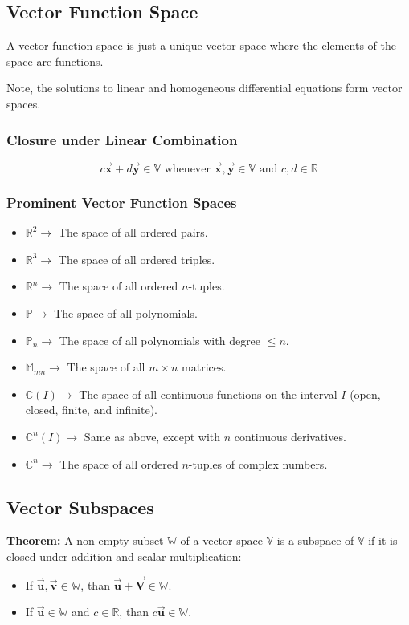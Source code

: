 \documentclass[12pt, landscape, twocolumn]{article}
\let\oldvec\vec
\renewcommand{\vec}[1]{\oldvec{\mathbf{ #1 } } }                    %
\begin{document}
    \subsection{Vector Function Space}
    A vector function space is just a unique vector space where the elements of the space are functions.

    Note, the solutions to linear and homogeneous differential equations form vector spaces.

        \subsubsection{Closure under Linear Combination}
        \begin{equation}\label{eq:funcspace_closure}
            c \vec{x} + d \vec{y} \in \mathbb{V} \text{ whenever } \vec{x}, \vec{y} \in \mathbb{V} \text{ and } c, d \in \mathbb{R}
        \end{equation}

        \subsubsection{Prominent Vector Function Spaces}
        \begin{itemize}
            \item $\mathbb{R}^2 \to$ The space of all ordered pairs.
            \item $\mathbb{R}^3 \to$ The space of all ordered triples.
            \item $\mathbb{R}^n \to$ The space of all ordered $n$-tuples.
            \item $\mathbb{P} \to$ The space of all polynomials.
            \item $\mathbb{P}_n \to$ The space of all polynomials with degree $\le n$.
            \item $\mathbb{M}_{mn} \to$ The space of all $m \times n$ matrices.
            \item $\mathbb{C}(I) \to$ The space of all continuous functions on the interval $I$ (open, closed, finite, and infinite).
            \item $\mathbb{C}^n(I) \to$ Same as above, except with $n$ continuous derivatives.
            \item $\mathbb{C}^n \to$ The space of all ordered $n$-tuples of complex numbers.
        \end{itemize}

    \subsection{Vector Subspaces}
    \textbf{Theorem:} A non-empty subset $\mathbb{W}$ of a vector space $\mathbb{V}$ is a subspace of $\mathbb{V}$ if it is closed under addition and scalar multiplication:
    \begin{itemize}
        \item If $\vec{u}, \vec{v} \in \mathbb{W}$, than $\vec{u} + \vec{V} \in \mathbb{W}$.
        \item If $\vec{u} \in \mathbb{W}$ and $c \in \mathbb{R}$, than $c\vec{u} \in \mathbb{W}$.
    \end{itemize}
\end{document}
